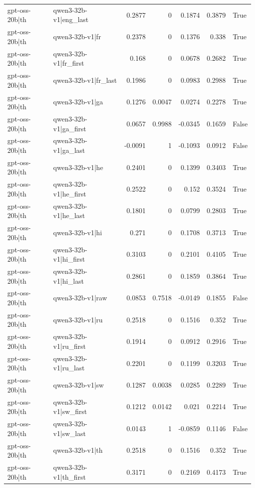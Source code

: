 \begin{table}
\begin{tabular}{l l r r r r l}
gpt-oss-20b|th & qwen3-32b-v1|eng_last & 0.2877 & 0 & 0.1874 & 0.3879 & True \\
gpt-oss-20b|th & qwen3-32b-v1|fr & 0.2378 & 0 & 0.1376 & 0.338 & True \\
gpt-oss-20b|th & qwen3-32b-v1|fr_first & 0.168 & 0 & 0.0678 & 0.2682 & True \\
gpt-oss-20b|th & qwen3-32b-v1|fr_last & 0.1986 & 0 & 0.0983 & 0.2988 & True \\
gpt-oss-20b|th & qwen3-32b-v1|ga & 0.1276 & 0.0047 & 0.0274 & 0.2278 & True \\
gpt-oss-20b|th & qwen3-32b-v1|ga_first & 0.0657 & 0.9988 & -0.0345 & 0.1659 & False \\
gpt-oss-20b|th & qwen3-32b-v1|ga_last & -0.0091 & 1 & -0.1093 & 0.0912 & False \\
gpt-oss-20b|th & qwen3-32b-v1|he & 0.2401 & 0 & 0.1399 & 0.3403 & True \\
gpt-oss-20b|th & qwen3-32b-v1|he_first & 0.2522 & 0 & 0.152 & 0.3524 & True \\
gpt-oss-20b|th & qwen3-32b-v1|he_last & 0.1801 & 0 & 0.0799 & 0.2803 & True \\
gpt-oss-20b|th & qwen3-32b-v1|hi & 0.271 & 0 & 0.1708 & 0.3713 & True \\
gpt-oss-20b|th & qwen3-32b-v1|hi_first & 0.3103 & 0 & 0.2101 & 0.4105 & True \\
gpt-oss-20b|th & qwen3-32b-v1|hi_last & 0.2861 & 0 & 0.1859 & 0.3864 & True \\
gpt-oss-20b|th & qwen3-32b-v1|raw & 0.0853 & 0.7518 & -0.0149 & 0.1855 & False \\
gpt-oss-20b|th & qwen3-32b-v1|ru & 0.2518 & 0 & 0.1516 & 0.352 & True \\
gpt-oss-20b|th & qwen3-32b-v1|ru_first & 0.1914 & 0 & 0.0912 & 0.2916 & True \\
gpt-oss-20b|th & qwen3-32b-v1|ru_last & 0.2201 & 0 & 0.1199 & 0.3203 & True \\
gpt-oss-20b|th & qwen3-32b-v1|sw & 0.1287 & 0.0038 & 0.0285 & 0.2289 & True \\
gpt-oss-20b|th & qwen3-32b-v1|sw_first & 0.1212 & 0.0142 & 0.021 & 0.2214 & True \\
gpt-oss-20b|th & qwen3-32b-v1|sw_last & 0.0143 & 1 & -0.0859 & 0.1146 & False \\
gpt-oss-20b|th & qwen3-32b-v1|th & 0.2518 & 0 & 0.1516 & 0.352 & True \\
gpt-oss-20b|th & qwen3-32b-v1|th_first & 0.3171 & 0 & 0.2169 & 0.4173 & True \\

\end{tabular}
\end{table}
